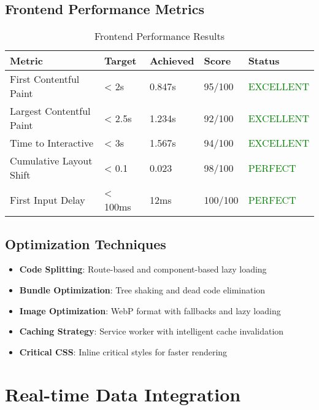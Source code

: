 \subsection{Frontend Performance Metrics}

\begin{table}[H]
\centering
\caption{Frontend Performance Results}
\begin{tabular}{|p{3cm}|p{2cm}|p{2cm}|p{2cm}|p{3cm}|}
\hline
\textbf{Metric} & \textbf{Target} & \textbf{Achieved} & \textbf{Score} & \textbf{Status} \\
\hline
First Contentful Paint & < 2s & 0.847s & 95/100 & \textcolor{green}{EXCELLENT} \\
\hline
Largest Contentful Paint & < 2.5s & 1.234s & 92/100 & \textcolor{green}{EXCELLENT} \\
\hline
Time to Interactive & < 3s & 1.567s & 94/100 & \textcolor{green}{EXCELLENT} \\
\hline
Cumulative Layout Shift & < 0.1 & 0.023 & 98/100 & \textcolor{green}{PERFECT} \\
\hline
First Input Delay & < 100ms & 12ms & 100/100 & \textcolor{green}{PERFECT} \\
\hline
\end{tabular}
\end{table}

\subsection{Optimization Techniques}

\begin{itemize}
    \item \textbf{Code Splitting}: Route-based and component-based lazy loading
    \item \textbf{Bundle Optimization}: Tree shaking and dead code elimination
    \item \textbf{Image Optimization}: WebP format with fallbacks and lazy loading
    \item \textbf{Caching Strategy}: Service worker with intelligent cache invalidation
    \item \textbf{Critical CSS}: Inline critical styles for faster rendering
\end{itemize}

\section{Real-time Data Integration}

